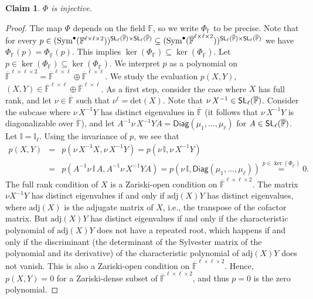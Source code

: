 \documentclass[a4paper]{extarticle}
\newcommand{\IF}{\mathbb{F}}
\newcommand{\oIF}{{\overline{\mathbb{F}}}}
\newcommand{\SL}{\textsf{\textup{SL}}}
\newcommand{\Sym}{\textup{Sym}}
\newcommand{\Diag}{\textsf{Diag}}
\newcommand{\adj}{\mathrm{adj}}
\renewcommand{\det}{\mathrm{det}}
\numberwithin{theorem}{section}
\newtheorem{claim}[theorem]{Claim}
\theoremstyle{definition}
\begin{document}
\begin{claim}
\label{cla:inj}
$\Phi$ is injective.
\end{claim}
\begin{proof}
The map $\Phi$ depends on the field $\IF$, so we write $\Phi_\IF$ to be precise.
Note that for every $p\in (\Sym^{\bullet}(\IF^{\ell\times\ell\times 2}))^{\SL_\ell(\oIF)\times \SL_\ell(\oIF)}
\subseteq
(\Sym^{\bullet}(\oIF^{\ell\times\ell\times 2}))^{\SL_\ell(\oIF)\times \SL_\ell(\oIF)}$
we have $\Phi_{\IF}(p)=\Phi_{\oIF}(p)$.
This implies $\ker(\Phi_\IF)\subseteq \ker(\Phi_\oIF)$.
Let $p \in \ker(\Phi_\IF) \subseteq \ker(\Phi_\oIF)$.
We interpret $p$ as a polynomial on $\oIF^{\ell\times\ell\times 2} = \oIF^{\ell\times\ell}\oplus\oIF^{\ell\times\ell}$.
We study the evaluation $p(X,Y)$, $(X,Y) \in \oIF^{\ell\times\ell}\oplus\oIF^{\ell\times\ell}$.
As a first step, consider the case where $X$ has full rank,
and let $\nu\in\oIF$ such that $\nu^\ell=\det(X)$. Note that $\nu \, X^{-1} \in \SL_\ell(\oIF)$.
Consider the subcase where $\nu \, X^{-1} Y$ has distinct eigenvalues in $\oIF$ (it follows that $\nu \, X^{-1} Y$ is diagonalizable over $\oIF$),
and let $A^{-1} \nu \, X^{-1} Y A = \Diag(\mu_1,\ldots,\mu_\ell)$ for $A \in \SL_\ell(\oIF)$.
Let $\mathbb{I} = \mathbb{I}_\ell$.
Using the invariance of $p$, we see that
\begin{eqnarray*}
p(X,Y) &=&
p(\nu\, X^{-1} X,\nu\, X^{-1} Y)
=
p(\nu\, \mathbb{I}, \nu\, X^{-1}Y)
\\
&=&
p(A^{-1}\nu\, \mathbb{I}\, A, A^{-1}\nu\, X^{-1} YA)
=
p(\nu\, \mathbb{I}, \Diag(\mu_1,\ldots,\mu_\ell)) \stackrel{p \in \ker(\Phi_{\oIF})}{=} 0.
\end{eqnarray*}
The full rank condition of $X$ is a Zariski-open condition on $\oIF^{\ell\times\ell\times 2}$.
The matrix $\nu X^{-1} Y$ has distinct eigenvalues if and only if $\adj(X) Y$ has distinct eigenvalues, where $\adj(X)$ is the adjugate matrix of $X$, i.e., the transpose of the cofactor matrix.
But $\adj(X) Y$ has distinct eigenvalues if and only if the characteristic polynomial of $\adj(X) Y$ does not have a repeated root,
which happens if and only if the discriminant (the determinant of the Sylvester matrix of the polynomial and its derivative) of the characteristic polynomial of $\adj(X) Y$ does not vanish.
This is also a Zariski-open condition on $\oIF^{\ell\times\ell\times 2}$.
Hence, $p(X,Y)=0$ for a Zariski-dense subset of $\oIF^{\ell\times\ell\times 2}$, and thus $p=0$ is the zero polynomial.
\end{proof}
\end{document}

